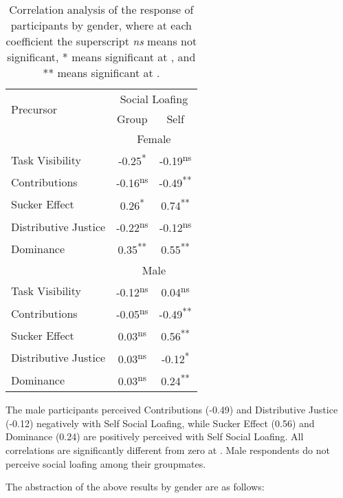 \documentclass[a4paper,a4paper,BCOR12mm,12pt,abstracton,pointednumbers,tablecaptionabove,footinclude,halfparskip,normalheadings,]{scrartcl}
\begin{document}
\begin{table}[hbt]
\caption{Correlation analysis of the response of participants by gender, where at each coefficient the superscript {\em ns} means not significant, * means significant at , and ** means significant at .}\label{tab:cor-gender}
\centering\begin{tabular}{lcc}
\hline\hline
\multirow{2}{*}{Precursor} & \multicolumn{2}{c}{Social Loafing}\\
\cline{2-3}
                           & Group & Self\\
\hline
                & \multicolumn{2}{c}{Female}\\
\cline{2-3}
Task Visibility & -0.25\textsuperscript{*}  & -0.19\textsuperscript{ns} \\
Contributions   & -0.16\textsuperscript{ns} & -0.49\textsuperscript{**} \\
Sucker Effect   &  0.26\textsuperscript{*}  &  0.74\textsuperscript{**} \\
Distributive Justice & -0.22\textsuperscript{ns} & -0.12\textsuperscript{ns}\\
Dominance       &  0.35\textsuperscript{**} &  0.55\textsuperscript{**}\\
\hline
                & \multicolumn{2}{c}{Male}\\
\cline{2-3}
Task Visibility & -0.12\textsuperscript{ns} &  0.04\textsuperscript{ns} \\
Contributions   & -0.05\textsuperscript{ns} & -0.49\textsuperscript{**} \\
Sucker Effect   &  0.03\textsuperscript{ns} &  0.56\textsuperscript{**} \\
Distributive Justice & 0.03\textsuperscript{ns} & -0.12\textsuperscript{*}\\
Dominance       &  0.03\textsuperscript{ns} &  0.24\textsuperscript{**}\\
\hline\hline
\end{tabular}
\end{table}

The male participants perceived Contributions (-0.49) and Distributive Justice (-0.12) negatively with Self Social Loafing, while Sucker Effect (0.56) and Dominance (0.24) are positively perceived with Self Social Loafing. All correlations are significantly different from zero at . Male respondents do not perceive social loafing among their groupmates.

The abstraction of the above results by gender are as follows:
\end{document}
